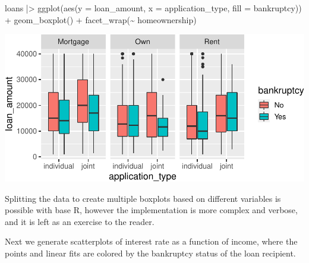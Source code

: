 \documentclass[12pt]{article}
\newenvironment{Shaded}{\begin{snugshade}}{\end{snugshade}}
\newcommand{\AttributeTok}[1]{\textcolor[rgb]{0.77,0.63,0.00}{#1}}
\newcommand{\FunctionTok}[1]{\textcolor[rgb]{0.00,0.00,0.00}{#1}}
\newcommand{\NormalTok}[1]{#1}
\newcommand{\SpecialCharTok}[1]{\textcolor[rgb]{0.00,0.00,0.00}{#1}}
\begin{document}
\begin{Shaded}
\begin{Highlighting}[]
\NormalTok{loans }\SpecialCharTok{|\textgreater{}}
  \FunctionTok{ggplot}\NormalTok{(}\FunctionTok{aes}\NormalTok{(}\AttributeTok{y =}\NormalTok{ loan\_amount, }\AttributeTok{x =}\NormalTok{ application\_type, }\AttributeTok{fill =}\NormalTok{ bankruptcy)) }\SpecialCharTok{+}
  \FunctionTok{geom\_boxplot}\NormalTok{() }\SpecialCharTok{+}
  \FunctionTok{facet\_wrap}\NormalTok{(}\SpecialCharTok{\textasciitilde{}}\NormalTok{ homeownership)}
\end{Highlighting}
\end{Shaded}

\begin{center}\includegraphics[width=0.9\linewidth]{educators-perspective-tidyverse_files/figure-latex/ggplot_ex2-1} \end{center}

\label{ggplot-ex2} \linespread{2}
\vspace{3mm}\setlength{\parindent}{15pt}

Splitting the data to create multiple boxplots based on different
variables is possible with base R, however the implementation is more
complex and verbose, and it is left as an exercise to the reader.

Next we generate scatterplots of interest rate as a function of income,
where the points and linear fits are colored by the bankruptcy status of
the loan recipient.

\linespread{1}
\end{document}
